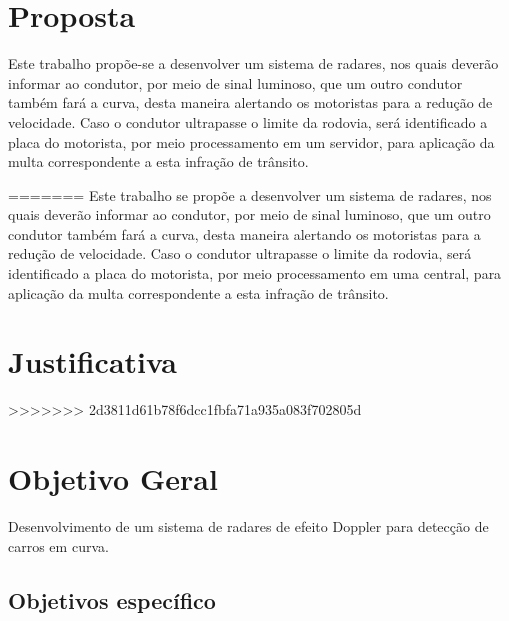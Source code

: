 \section{Proposta}

Este trabalho propõe-se a desenvolver um sistema de radares, nos quais deverão informar ao condutor, por meio de sinal luminoso, que um outro condutor também fará a curva, desta maneira alertando os motoristas para a redução de velocidade. Caso o condutor ultrapasse o limite da rodovia, será identificado a placa do motorista, por meio processamento em um servidor, para aplicação da multa correspondente a esta infração de trânsito.


=======
Este trabalho se propõe a desenvolver um sistema de radares, nos quais deverão informar ao condutor, por meio de sinal luminoso, que um outro condutor também fará a curva, desta maneira alertando os motoristas para a redução de velocidade. Caso o condutor ultrapasse o limite da rodovia, será identificado a placa do motorista, por meio processamento em uma central, para aplicação da multa correspondente a esta infração de trânsito.

\section{Justificativa}
>>>>>>> 2d3811d61b78f6dcc1fbfa71a935a083f702805d
\section{Objetivo Geral}

Desenvolvimento de um sistema de radares de efeito Doppler para detecção de carros em curva.


\subsection{Objetivos específico}
